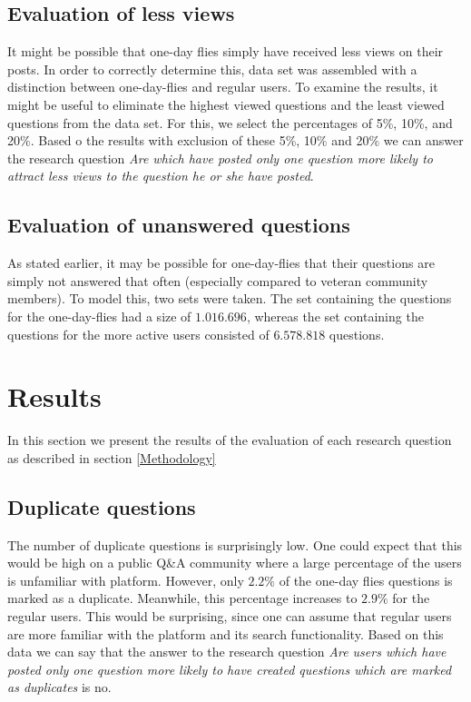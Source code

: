 \documentclass[conference]{IEEEtran}
\begin{document}
\subsection{Evaluation of less views}
It might be possible that one-day flies simply have received less views on
their posts.  In order to correctly determine this, data set was assembled with
a distinction between one-day-flies and regular users. To examine the results,
it might be useful to eliminate the highest viewed questions and the least
viewed questions  from the data set. For this, we select the percentages of
5\%, 10\%, and 20\%. Based o the results with exclusion of these 5\%, 10\% and
20\% we can answer the research question \textit{Are which have posted only one
question more likely to attract less views to the question he or she have
posted}.


\subsection{Evaluation of unanswered questions}

As stated earlier, it may be possible for one-day-flies that their questions
are simply not answered that often (especially compared to veteran community
members). To model this, two sets were taken. The set containing the questions
for the one-day-flies had a size of $1.016.696$, whereas the set containing the
questions for the more active users consisted of $6.578.818$ questions.

\section{Results}

In this section we present the results of the evaluation of each research
question as described in section \ref{Methodology}

\subsection{Duplicate questions}

The number of duplicate questions is surprisingly low. One could expect that
this would be high on a public Q\&A community where a large percentage of the
users is unfamiliar with platform. However, only $2.2\%$ of the one-day flies
questions is marked as a duplicate. Meanwhile, this percentage increases to
$2.9\%$ for the regular users. This would be surprising, since one can assume
that regular users are more familiar with the platform and its search
functionality. Based on this data we can say that the answer to the research
question \textit{Are users which have posted only one question more likely to
have created questions which are marked as duplicates} is no.
\end{document}
